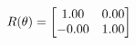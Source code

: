 \documentclass[preview]{standalone}
\begin{document}
\begin{align*}
\special{dvisvgm:raw <g id='unique000'>}R(\theta) = \begin{bmatrix}1.00 & 0.00\\-0.00 & 1.00\end{bmatrix}\special{dvisvgm:raw </g>}
\end{align*}
\end{document}
